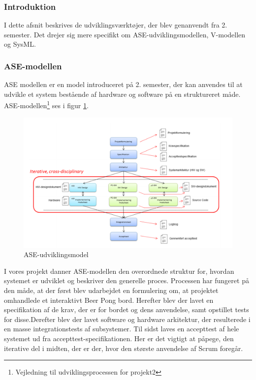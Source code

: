 \documentclass[a4paper,12pt,fleqn,oneside]{article}
\begin{document}
\subsubsection{Introduktion}
I dette afsnit beskrives de udviklingsværktøjer, der blev genanvendt fra 2. semester. Det drejer sig mere specifikt om ASE-udviklingsmodellen, V-modellen og SysML.
\subsubsection{ASE-modellen}
ASE modellen er en model introduceret på 2. semester, der kan anvendes til at udvikle et system bestående af hardware og software på en struktureret måde. ASE-modellen\footnote{Vejledning til udviklingsprocessen for projekt2} ses i figur \ref{fig:ASE_model}.
\begin{figure}[H]
    \centering
    \includegraphics[width=\textwidth]{Processdokument/graphics/ASE_model.png}
    \caption{ASE-udviklingsmodel}
    \label{fig:ASE_model}
\end{figure}
I vores projekt danner ASE-modellen den overordnede struktur for, hvordan systemet er udviklet og beskriver den generelle proces. Processen har fungeret på den måde, at der først blev udarbejdet en formulering om, at projektet omhandlede et interaktivt Beer Pong bord. Herefter blev der lavet en specifikation af de krav, der er for bordet og dens anvendelse, samt opstillet tests for disse.Derefter blev der lavet software og hardware arkitektur, der resulterede i en masse integrationstests af subsystemer. Til sidst laves en accepttest af hele systemet ud fra accepttest-specifikationen. Her er det vigtigt at påpege, den iterative del i midten, der er der, hvor den største anvendelse af Scrum foregår.
\end{document}
